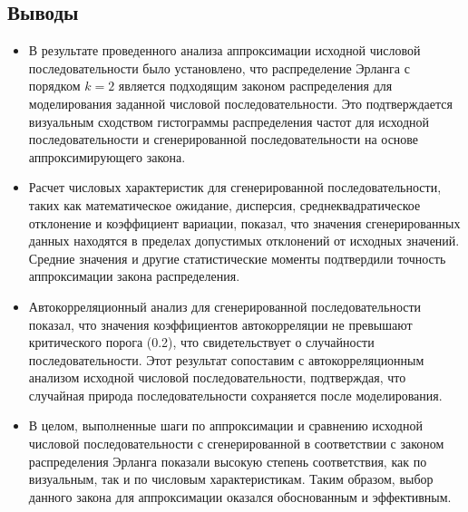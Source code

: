 \subsection{Выводы}

\begin{itemize}
	\item В результате проведенного анализа аппроксимации исходной числовой последовательности было установлено, что распределение Эрланга с порядком \( k = 2 \) является подходящим законом распределения для моделирования заданной числовой последовательности. Это подтверждается визуальным сходством гистограммы распределения частот для исходной последовательности и сгенерированной последовательности на основе аппроксимирующего закона.

	\item Расчет числовых характеристик для сгенерированной последовательности, таких как математическое ожидание, дисперсия, среднеквадратическое отклонение и коэффициент вариации, показал, что значения сгенерированных данных находятся в пределах допустимых отклонений от исходных значений. Средние значения и другие статистические моменты подтвердили точность аппроксимации закона распределения.

	\item Автокорреляционный анализ для сгенерированной последовательности показал, что значения коэффициентов автокорреляции не превышают критического порога (0.2), что свидетельствует о случайности последовательности. Этот результат сопоставим с автокорреляционным анализом исходной числовой последовательности, подтверждая, что случайная природа последовательности сохраняется после моделирования.

	\item В целом, выполненные шаги по аппроксимации и сравнению исходной числовой последовательности с сгенерированной в соответствии с законом распределения Эрланга показали высокую степень соответствия, как по визуальным, так и по числовым характеристикам. Таким образом, выбор данного закона для аппроксимации оказался обоснованным и эффективным.
\end{itemize}
